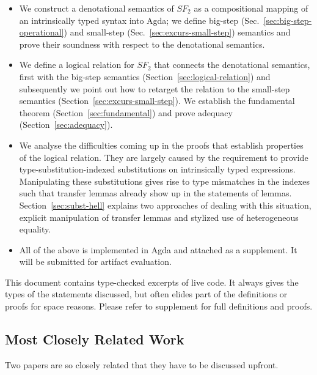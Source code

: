 \documentclass[sigplan,anonymous,review,screen]{acmart}
\begin{document}
\begin{itemize}
\item We construct a denotational semantics of $SF_2$ as a
  compositional mapping of an intrinsically typed syntax into Agda; we
  define big-step (Sec.~\ref{sec:big-step-operational}) and small-step
  (Sec.~\ref{sec:excurs-small-step}) semantics and prove their
  soundness with respect to the denotational semantics.
\item We define a logical relation for $SF_2$ that connects the
  denotational semantics, first with the big-step semantics
  (Section~\ref{sec:logical-relation}) and subsequently we point out
  how to retarget the relation to the small-step semantics
  (Section~\ref{sec:excurs-small-step}). We establish the fundamental
  theorem (Section~\ref{sec:fundamental}) and prove adequacy
  (Section~\ref{sec:adequacy}). 
\item We analyse the difficulties coming up in the proofs that
  establish properties of the logical relation. They are
  largely caused by the requirement to provide
  type-substitution-indexed substitutions on intrinsically typed
  expressions. Manipulating these substitutions gives rise to type
  mismatches in the indexes such that transfer lemmas already show up in the
  statements of lemmas. Section~\ref{sec:subst-hell} explains two
  approaches of dealing with this situation, explicit manipulation of
  transfer lemmas and stylized use of heterogeneous equality.
\item All of the above is implemented in Agda
  \cite{norell07:_towar_pract_progr_languag_depen_type_theor} and
  attached as a supplement. It will be submitted for artifact
  evaluation.
\end{itemize}
This document contains type-checked excerpts of live code. It always
gives the types of the statements discussed, but often elides part of
the definitions or proofs for space reasons. Please refer to
supplement for full definitions and proofs.

\subsection*{Most Closely Related Work}
\label{sec:most-closely-related}

Two papers are so closely related that they have to be discussed
upfront.
\end{document}
